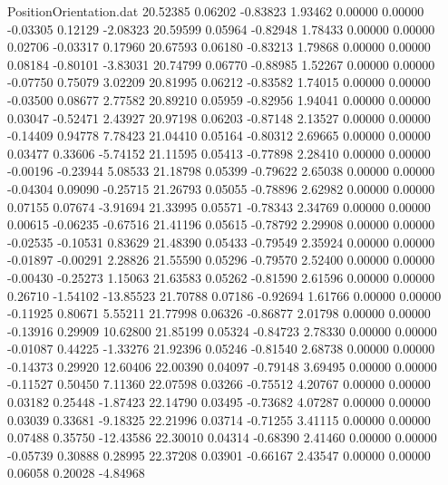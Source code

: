 \begin{filecontents}{PositionOrientation.dat}
  20.52385    0.06202   -0.83823     1.93462    0.00000    0.00000   -0.03305    0.12129   -2.08323
  20.59599    0.05964   -0.82948     1.78433    0.00000    0.00000    0.02706   -0.03317    0.17960
  20.67593    0.06180   -0.83213     1.79868    0.00000    0.00000    0.08184   -0.80101   -3.83031
  20.74799    0.06770   -0.88985     1.52267    0.00000    0.00000   -0.07750    0.75079    3.02209
  20.81995    0.06212   -0.83582     1.74015    0.00000    0.00000   -0.03500    0.08677    2.77582
  20.89210    0.05959   -0.82956     1.94041    0.00000    0.00000    0.03047   -0.52471    2.43927
  20.97198    0.06203   -0.87148     2.13527    0.00000    0.00000   -0.14409    0.94778    7.78423
  21.04410    0.05164   -0.80312     2.69665    0.00000    0.00000    0.03477    0.33606   -5.74152
  21.11595    0.05413   -0.77898     2.28410    0.00000    0.00000   -0.00196   -0.23944    5.08533
  21.18798    0.05399   -0.79622     2.65038    0.00000    0.00000   -0.04304    0.09090   -0.25715
  21.26793    0.05055   -0.78896     2.62982    0.00000    0.00000    0.07155    0.07674   -3.91694
  21.33995    0.05571   -0.78343     2.34769    0.00000    0.00000    0.00615   -0.06235   -0.67516
  21.41196    0.05615   -0.78792     2.29908    0.00000    0.00000   -0.02535   -0.10531    0.83629
  21.48390    0.05433   -0.79549     2.35924    0.00000    0.00000   -0.01897   -0.00291    2.28826
  21.55590    0.05296   -0.79570     2.52400    0.00000    0.00000   -0.00430   -0.25273    1.15063
  21.63583    0.05262   -0.81590     2.61596    0.00000    0.00000    0.26710   -1.54102  -13.85523
  21.70788    0.07186   -0.92694     1.61766    0.00000    0.00000   -0.11925    0.80671    5.55211
  21.77998    0.06326   -0.86877     2.01798    0.00000    0.00000   -0.13916    0.29909   10.62800
  21.85199    0.05324   -0.84723     2.78330    0.00000    0.00000   -0.01087    0.44225   -1.33276
  21.92396    0.05246   -0.81540     2.68738    0.00000    0.00000   -0.14373    0.29920   12.60406
  22.00390    0.04097   -0.79148     3.69495    0.00000    0.00000   -0.11527    0.50450    7.11360
  22.07598    0.03266   -0.75512     4.20767    0.00000    0.00000    0.03182    0.25448   -1.87423
  22.14790    0.03495   -0.73682     4.07287    0.00000    0.00000    0.03039    0.33681   -9.18325
  22.21996    0.03714   -0.71255     3.41115    0.00000    0.00000    0.07488    0.35750  -12.43586
  22.30010    0.04314   -0.68390     2.41460    0.00000    0.00000   -0.05739    0.30888    0.28995
  22.37208    0.03901   -0.66167     2.43547    0.00000    0.00000    0.06058    0.20028   -4.84968

\end{filecontents}
